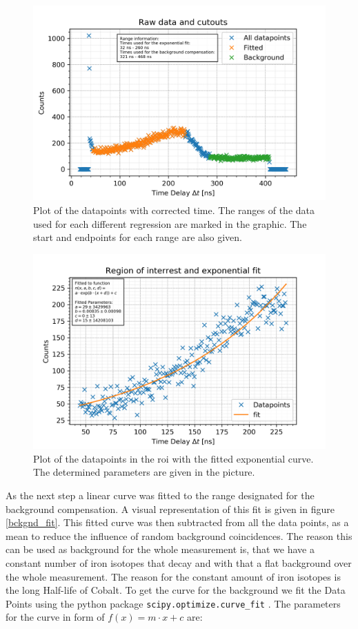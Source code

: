 \documentclass[30pt,a4paper]{article}
\begin{document}
 	
 	\begin{figure}[h]
 		\includegraphics{Bilder/raw_ranges}
 		\centering
 		\caption[Raw Data Counts]{\small Plot of the datapoints with corrected time. The ranges of the data used for each different regression are marked in the graphic. The start and endpoints for each range are also given.}
 		\label{raw_plot}
 	\end{figure}
 	\begin{figure}[h]
 		\includegraphics{Bilder/lin_fit_exp}
 		\centering
 		\caption[Exponential Fit of the Decay]{\small Plot of the datapoints in the roi with the fitted exponential curve. The determined parameters are given in the picture.}
 		\label{exp_fit}
 	\end{figure}
 	As the next step a linear curve was
 	fitted to the range designated for the background compensation. A visual
 	representation of this fit is given in figure \ref{bckgnd_fit}. This fitted curve
 	was then subtracted from all the data points, as a mean to reduce the influence of
 	random background coincidences. The reason this can be used as background for the whole measurement is, that we have a constant number of iron isotopes that decay and with that a flat background over the whole measurement. The reason for the constant amount of iron isotopes is the long Half-life of Cobalt.  To get the curve for the background we fit the Data Points using the python package \verb|scipy.optimize.curve_fit| \cite{SciPy_Opti}.
 	The parameters for the curve in form of $f(x)=m\cdot x+c$ are:
 	
\end{document}
